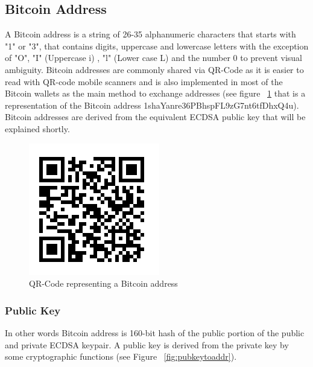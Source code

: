 \subsection{Bitcoin Address}
A Bitcoin address is a string of 26-35 alphanumeric characters that starts with "1" or "3", that contains digits, uppercase and lowercase letters with the exception of "O", "I" (Uppercase i) , "l" (Lower case L) and the number 0 to prevent visual ambiguity. Bitcoin addresses are commonly shared via QR-Code as it is easier to read with QR-code mobile scanners and is also implemented in most of the Bitcoin wallets as the main method to exchange addresses (see figure ~\ref{fig:Bitcoinqr} that is a representation of the Bitcoin address 1shaYanre36PBhspFL9zG7nt6tfDhxQ4u). Bitcoin addresses are derived from the equivalent ECDSA public key that will be explained shortly.

\begin{figure}
\centering
\includegraphics[scale=0.8]{fig/Bitcoinqr.png}
  \caption{QR-Code representing a Bitcoin address}
\label{fig:Bitcoinqr}
\end{figure}

\subsubsection{Public Key}
 In other words Bitcoin address is 160-bit hash of the public portion of the public and private ECDSA keypair. A public key is derived from the private key by some cryptographic functions (see Figure ~\ref{fig:pubkeytoaddr}). 

